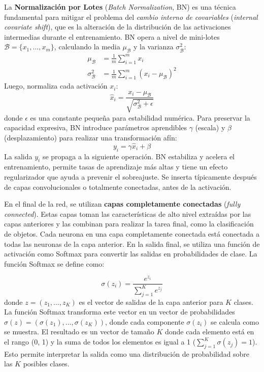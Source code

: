 \documentclass[11pt,spanish,listoffigures,listoftables]{tfgetsinf}
\begin{document}
La \textbf{Normalización por Lotes} (\textit{Batch Normalization}, BN) es una técnica fundamental para mitigar el problema del \textit{cambio interno de covariables} (\textit{internal covariate shift}), que es la alteración de la distribución de las activaciones intermedias durante el entrenamiento. BN opera a nivel de mini-lotes $\mathcal{B} = \{x_1, \dots, x_m\}$, calculando la media $\mu_{\mathcal{B}}$ y la varianza $\sigma^2_{\mathcal{B}}$:
\begin{align}
   \mu_{\mathcal{B}} &= \frac{1}{m} \sum_{i=1}^{m} x_i \\
   \sigma^2_{\mathcal{B}} &= \frac{1}{m} \sum_{i=1}^{m} (x_i - \mu_{\mathcal{B}})^2
\end{align}
Luego, normaliza cada activación $x_i$:
\begin{equation}
   \hat{x}_i = \frac{x_i - \mu_{\mathcal{B}}}{\sqrt{\sigma^2_{\mathcal{B}} + \epsilon}}
\end{equation}
donde $\epsilon$ es una constante pequeña para estabilidad numérica. Para preservar la capacidad expresiva, BN introduce parámetros aprendibles $\gamma$ (escala) y $\beta$ (desplazamiento) para realizar una transformación afín:
\begin{equation}
   y_i = \gamma \hat{x}_i + \beta
\end{equation}
La salida $y_i$ se propaga a la siguiente operación. BN estabiliza y acelera el entrenamiento, permite tasas de aprendizaje más altas y tiene un efecto regularizador que ayuda a prevenir el sobreajuste. Se inserta típicamente después de capas convolucionales o totalmente conectadas, antes de la activación.

En el final de la red, se utilizan \textbf{capas completamente conectadas} (\textit{fully connected}). Estas capas toman las características de alto nivel extraídas por las capas anteriores y las combinan para realizar la tarea final, como la clasificación de objetos. Cada neurona en una capa completamente conectada está conectada a todas las neuronas de la capa anterior. En la salida final, se utiliza una función de activación como Softmax para convertir las salidas en probabilidades de clase. La función Softmax se define como:

\begin{equation}
   \sigma(z_i) = \frac{e^{z_i}}{\sum_{j=1}^{K} e^{z_j}}
\end{equation}
donde $z = (z_1, \dots, z_K)$ es el vector de salidas de la capa anterior para $K$ clases. La función Softmax transforma este vector en un vector de probabilidades $\sigma(z) = (\sigma(z_1), \dots, \sigma(z_K))$, donde cada componente $\sigma(z_i)$ se calcula como se muestra. El resultado es un vector de tamaño $K$ donde cada elemento está en el rango (0, 1) y la suma de todos los elementos es igual a 1 ($\sum_{j=1}^{K} \sigma(z_j) = 1$). Esto permite interpretar la salida como una distribución de probabilidad sobre las $K$ posibles clases.
\end{document}
